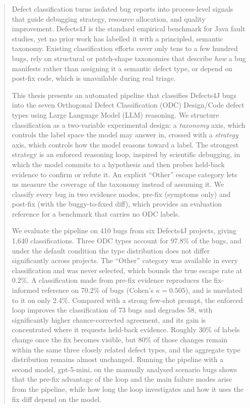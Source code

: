 \documentclass{iutbscthesis}
\begin{document}
\begin{abstract}
Defect classification turns isolated bug reports into process-level signals that guide debugging strategy, resource allocation, and quality improvement. Defects4J is the standard empirical benchmark for Java fault studies, yet no prior work has labelled it with a principled, semantic taxonomy. Existing classification efforts cover only tens to a few hundred bugs, rely on structural or patch-shape taxonomies that describe \emph{how} a bug manifests rather than assigning it a semantic defect type, or depend on post-fix code, which is unavailable during real triage.

This thesis presents an automated pipeline that classifies Defects4J bugs into the seven Orthogonal Defect Classification (ODC) Design/Code defect types using Large Language Model (LLM) reasoning. We structure classification as a two-variable experimental design: a \emph{taxonomy} axis, which controls the label space the model may answer in, crossed with a \emph{strategy} axis, which controls how the model reasons toward a label. The strongest strategy is an enforced reasoning loop, inspired by scientific debugging, in which the model commits to a hypothesis and then probes held-back evidence to confirm or refute it. An explicit ``Other'' escape category lets us measure the coverage of the taxonomy instead of assuming it. We classify every bug in two evidence modes, pre-fix (symptoms only) and post-fix (with the buggy-to-fixed diff), which provides an evaluation reference for a benchmark that carries no ODC labels.

We evaluate the pipeline on 410 bugs from six Defects4J projects, giving 1{,}640 classifications. Three ODC types account for 97.8\% of the bugs, and under the default condition the type distribution does not differ significantly across projects. The ``Other'' category was available in every classification and was never selected, which bounds the true escape rate at 0.2\%. A classification made from pre-fix evidence reproduces the fix-informed reference on 70.2\% of bugs (Cohen's $\kappa = 0.505$), and is unrelated to it on only 2.4\%. Compared with a strong few-shot prompt, the enforced loop improves the classification of 73 bugs and degrades 58, with significantly higher chance-corrected agreement, and its gain is concentrated where it requests held-back evidence. Roughly 30\% of labels change once the fix becomes visible, but 80\% of those changes remain within the same three closely related defect types, and the aggregate type distribution remains almost unchanged. Running the pipeline with a second model, gpt-5-mini, on the manually analysed scenario bugs shows that the pre-fix advantage of the loop and the main failure modes arise from the pipeline, while how long the loop investigates and how it uses the fix diff depend on the model.
\end{abstract}
\end{document}
